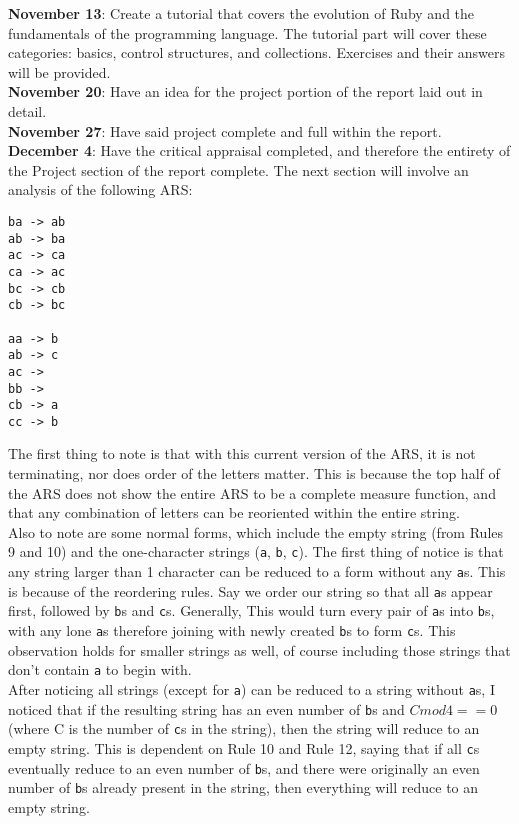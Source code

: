\documentclass{article}
\theoremstyle{theorem}
\theoremstyle{definition}
\theoremstyle{remark}
\begin{document}
\noindent \textbf{November 13}: Create a tutorial that covers the evolution of Ruby and the fundamentals of the programming language. The tutorial part will cover these categories: basics, control structures, and collections. Exercises and their answers will be provided.\\

\noindent \textbf{November 20}: Have an idea for the project portion of the report laid out in detail.\\

\noindent \textbf{November 27}: Have said project complete and full within the report.\\

\noindent \textbf{December 4}: Have the critical appraisal completed, and therefore the entirety of the Project section of the report complete.
\newpage
\noindent The next section will involve an analysis of the following ARS:
\begin{lstlisting}
ba -> ab
ab -> ba
ac -> ca
ca -> ac
bc -> cb
cb -> bc
 
aa -> b
ab -> c
ac ->  
bb ->
cb -> a
cc -> b
\end{lstlisting}

\noindent The first thing to note is that with this current version of the ARS, it is not terminating, nor does order of the letters matter. This is because the top half of the ARS does not show the entire ARS to be a complete measure function, and that any combination of letters can be reoriented within the entire string. \\

\noindent Also to note are some normal forms, which include the empty string (from Rules 9 and 10) and the one-character strings (\texttt{a}, \texttt{b}, \texttt{c}). The first thing of notice is that any string larger than 1 character can be reduced to a form without any \texttt{a}s. This is because of the reordering rules. Say we order our string so that all \texttt{a}s appear first, followed by \texttt{b}s and \texttt{c}s. Generally, This would turn every pair of \texttt{a}s into \texttt{b}s, with any lone \texttt{a}s therefore joining with newly created \texttt{b}s to form \texttt{c}s. This observation holds for smaller strings as well, of course including those strings that don't contain \texttt{a} to begin with.\\

\noindent After noticing all strings (except for \texttt{a}) can be reduced to a string without \texttt{a}s, I noticed that if the resulting string has an even number of \texttt{b}s and $C mod 4 == 0$ (where C is the number of \texttt{c}s in the string), then the string will reduce to an empty string. This is dependent on Rule 10 and Rule 12, saying that if all \texttt{c}s eventually reduce to an even number of \texttt{b}s, and there were originally an even number of \texttt{b}s already present in the string, then everything will reduce to an empty string.
\end{document}
